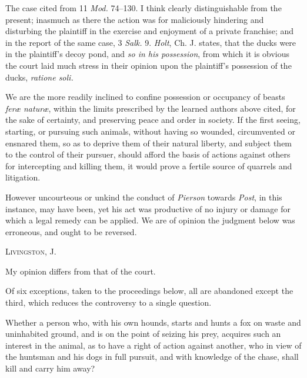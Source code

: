 The case cited from 11 \textit{Mod.}
74--130.
I think clearly distinguishable from the present; inasmuch as there the action
was for maliciously hindering and disturbing the plaintiff in the exercise and
enjoyment of a private franchise; and in the report of the same case, 3
\textit{Salk.} 9. \textit{Holt}, Ch. J. states, that the ducks were in the
plaintiff's decoy pond, and \textit{so in his possession}, from which it is
obvious the court laid much stress in their opinion upon the plaintiff's
possession of the ducks, \textit{ratione soli.}

We are the more readily inclined to confine possession or occupancy of beasts
\textit{fer{\ae} natur{\ae}}, within the limits prescribed by the learned
authors above cited, for the sake of certainty, and preserving peace and order
in society. If the first seeing, starting, or pursuing such animals, without
having so wounded, circumvented or ensnared them, so as to deprive them of their
natural liberty, and subject them to the control of their pursuer, should afford
the basis of actions against others for intercepting and killing them, it would
prove a fertile source of quarrels and litigation.

However uncourteous or unkind the conduct of \textit{Pierson} towards
\textit{Post}, in this instance, may have been, yet his act was productive of no
injury or damage for which a legal remedy can be applied. We are of opinion the
judgment below was erroneous, and ought to be reversed.

\opinion \textsc{Livingston}, J. 

My opinion differs from that of the court.

Of six exceptions, taken to the proceedings below, all are abandoned except the
third, which reduces the controversy to a single question.

Whether a person who, with his own hounds, starts and hunts a fox on waste and
uninhabited ground, and is on the point of seizing his prey, acquires such an
interest in the animal, as to have a right of action against another, who in
view of the huntsman and his dogs in full pursuit, and with knowledge of the
chase, shall kill and carry him away?

